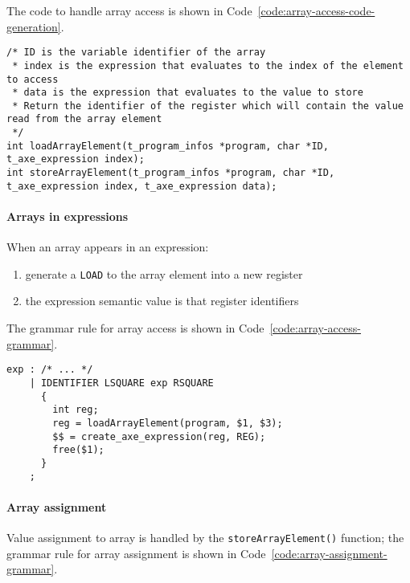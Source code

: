 The code to handle array access is shown in Code~\ref{code:array-access-code-generation}.

\begin{onepage}
  \begin{lstlisting}[language=LANCE, caption={Array access code generation}, label={code:array-access-code-generation}]
/* ID is the variable identifier of the array
 * index is the expression that evaluates to the index of the element to access
 * data is the expression that evaluates to the value to store
 * Return the identifier of the register which will contain the value read from the array element
 */
int loadArrayElement(t_program_infos *program, char *ID, t_axe_expression index);
int storeArrayElement(t_program_infos *program, char *ID, t_axe_expression index, t_axe_expression data);
\end{lstlisting}
\end{onepage}

\paragraph{Arrays in expressions}

When an array appears in an expression:

\begin{enumerate}
  \item generate a \texttt{LOAD} to the array element into a new register
  \item the expression semantic value is that register identifiers
\end{enumerate}

The grammar rule for array access is shown in Code~\ref{code:array-access-grammar}.

\begin{onepage}
  \begin{lstlisting}[language=LANCE, caption={Array access grammar}, label={code:array-access-grammar}]
exp : /* ... */
    | IDENTIFIER LSQUARE exp RSQUARE
      {
        int reg;
        reg = loadArrayElement(program, $1, $3);
        $$ = create_axe_expression(reg, REG);
        free($1);
      }
    ;
\end{lstlisting}
\end{onepage}

\paragraph{Array assignment}

Value assignment to array is handled by the \texttt{storeArrayElement()} function;
the grammar rule for array assignment is shown in Code~\ref{code:array-assignment-grammar}.

